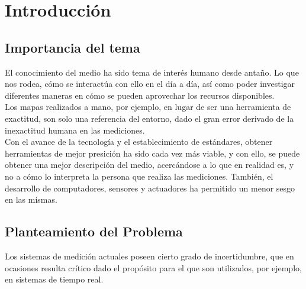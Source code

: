 
\chapter{Introducción} %

\label{chap:Intro} %


\newcommand{\keyword}[1]{\textbf{#1}}
\newcommand{\tabhead}[1]{\textbf{#1}}
\newcommand{\code}[1]{\texttt{#1}}
\newcommand{\file}[1]{\texttt{\bfseries#1}}
\newcommand{\option}[1]{\texttt{\itshape#1}}


\section{Importancia del tema}
El conocimiento del medio ha sido tema de interés humano desde antaño. Lo que nos rodea, cómo se interactúa con ello en el día a día, así como poder investigar diferentes maneras en cómo se pueden aprovechar los recursos disponibles. \\

Los mapas realizados a mano, por ejemplo, en lugar de ser una herramienta de exactitud, son solo una referencia del entorno, dado el gran error derivado de la inexactitud humana en las mediciones. \\

Con el avance de la tecnología y el establecimiento de estándares, obtener herramientas de mejor presición ha sido cada vez más viable, y con ello, se puede obtener una mejor descripción del medio, acercándose a lo que en realidad es, y no a cómo lo interpreta la persona que realiza las mediciones. También, el desarrollo de computadores, sensores y actuadores ha permitido un menor sesgo en las mismas. 

\section{Planteamiento del Problema}
Los sistemas de medición actuales poseen cierto grado de incertidumbre, que en ocasiones resulta crítico dado el propósito para el que son utilizados, por ejemplo, en sistemas de tiempo real. \\

